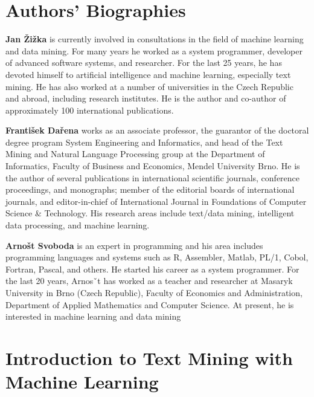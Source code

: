 \documentclass[11pt,openany,executivepaper]{book}
\makeatletter
\renewcommand\mainmatter{%
    \clearpage
  \@mainmattertrue
  \pagenumbering{arabic}
  
  }
\makeatother
\begin{document}
\cleardoublepage
{}
{}

\chapter*{Authors' Biographies}
\setlength{\parindent}{0pt}
\textbf{Jan \v{Z}i\v{z}ka} is currently involved in consultations in the field of machine learning
and data mining. For many years he worked as a system programmer, developer of
advanced software systems, and researcher. For the last 25 years, he has devoted
himself to artificial intelligence and machine learning, especially text mining. He
has also worked at a number of universities in the Czech Republic and abroad,
including research institutes. He is the author and co-author of approximately
100 international publications.

\textbf{Franti\v{s}ek Da\v{r}ena} works as an associate professor, the guarantor of the
doctoral degree program System Engineering and Informatics, and head of
the Text Mining and Natural Language Processing group at the Department of
Informatics, Faculty of Business and Economics, Mendel University Brno. He is
the author of several publications in international scientific journals, conference
proceedings, and monographs; member of the editorial boards of international
journals, and editor-in-chief of International Journal in Foundations of Computer
Science \& Technology. His research areas include text/data mining, intelligent
data processing, and machine learning.

\textbf{Arno\v{s}t Svoboda} is an expert in programming and his area includes programming
languages and systems such as R, Assembler, Matlab, PL/1, Cobol, Fortran,
Pascal, and others. He started his career as a system programmer. For the last
20 years, Arnosˇt has worked as a teacher and researcher at Masaryk University in
Brno (Czech Republic), Faculty of Economics and Administration, Department
of Applied Mathematics and Computer Science. At present, he is interested in
machine learning and data mining


\mainmatter
\pagestyle{fancy}
\chapter{Introduction to Text Mining with Machine Learning}
\end{document}
